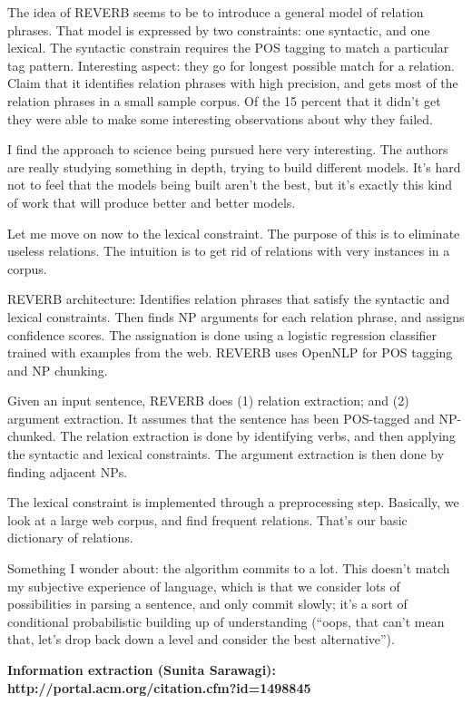 The idea of REVERB seems to be to introduce a general model of
relation phrases.  That model is expressed by two constraints: one
syntactic, and one lexical.  The syntactic constrain requires the POS
tagging to match a particular tag pattern.  Interesting aspect: they
go for longest possible match for a relation.  Claim that it
identifies relation phrases with high precision, and gets most of the
relation phrases in a small sample corpus.  Of the 15 percent that it
didn't get they were able to make some interesting observations about
why they failed.

I find the approach to science being pursued here very interesting.
The authors are really studying something in depth, trying to build
different models.  It's hard not to feel that the models being built
aren't the best, but it's exactly this kind of work that will produce
better and better models.

Let me move on now to the lexical constraint.  The purpose of this is
to eliminate useless relations.  The intuition is to get rid of
relations with very instances in a corpus.

REVERB architecture: Identifies relation phrases that satisfy the
syntactic and lexical constraints.  Then finds NP arguments for each
relation phrase, and assigns confidence scores.  The assignation is
done using a logistic regression classifier trained with examples from
the web.  REVERB uses OpenNLP for POS tagging and NP chunking.

Given an input sentence, REVERB does (1) relation extraction; and (2)
argument extraction.  It assumes that the sentence has been POS-tagged
and NP-chunked.  The relation extraction is done by identifying verbs,
and then applying the syntactic and lexical constraints.  The argument
extraction is then done by finding adjacent NPs.

The lexical constraint is implemented through a preprocessing step.
Basically, we look at a large web corpus, and find frequent relations.
That's our basic dictionary of relations.

Something I wonder about: the algorithm commits to a lot.  This
doesn't match my subjective experience of language, which is that we
consider lots of possibilities in parsing a sentence, and only commit
slowly; it's a sort of conditional probabilistic building up of
understanding (``oops, that can't mean that, let's drop back down a
level and consider the best alternative'').


\textbf{Information extraction (Sunita Sarawagi):
http://portal.acm.org/citation.cfm?id=1498845}

